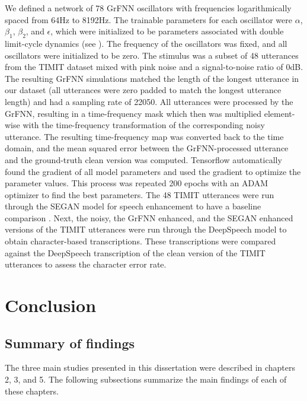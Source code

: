 \documentclass{report}
\begin{document}
We defined a network of 78 GrFNN oscillators with frequencies logarithmically spaced from 64Hz to 8192Hz. The trainable parameters for each oscillator were $\alpha$, $\beta_1$, $\beta_2$, and $\epsilon$, which were initialized to be parameters associated with double limit-cycle dynamics (see \cite{kim2015signal}). The frequency of the oscillators was fixed, and all oscillators were initialized to be zero. The stimulus was a subset of 48 utterances from the TIMIT dataset \cite{garofolo1993timit} mixed with pink noise and a signal-to-noise ratio of 0dB. The resulting GrFNN simulations matched the length of the longest utterance in our dataset (all utterances were zero padded to match the longest utterance length) and had a sampling rate of 22050. All utterances were processed by the GrFNN, resulting in a time-frequency mask which then was multiplied element-wise with the time-frequency transformation of the corresponding noisy utterance. The resulting time-frequency map was converted back to the time domain, and the mean squared error between the GrFNN-processed utterance and the ground-truth clean version was computed. Tensorflow automatically found the gradient of all model parameters and used the gradient to optimize the parameter values. This process was repeated 200 epochs with an ADAM optimizer \cite{kingma2014adam} to find the best parameters. The 48 TIMIT utterances were run through the SEGAN model for speech enhancement to have a baseline comparison \cite{pascual2017segan}. Next, the noisy, the GrFNN enhanced, and the SEGAN enhanced versions of the TIMIT utterances were run through the DeepSpeech model \cite{hannun2014deep} to obtain character-based transcriptions. These transcriptions were compared against the DeepSpeech transcription of the clean version of the TIMIT utterances to assess the character error rate. 


\chapter{Conclusion}

\section{Summary of findings}
The three main studies presented in this dissertation were described in chapters 2, 3, and 5. The following subsections summarize the main findings of each of these chapters.
\end{document}
